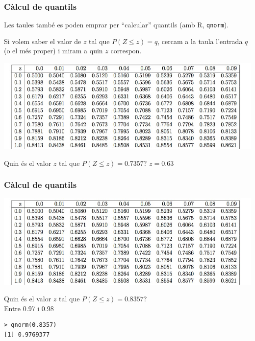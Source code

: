 \documentclass[12pt,t]{beamer}\usepackage[]{graphicx}\usepackage[]{color}
\renewcommand{\leq}{\leqslant}
\theoremstyle{plain}
\theoremstyle{definition}
\begin{document}
\begin{frame}
\frametitle{Càlcul de quantils}

Les taules també es poden emprar per ``calcular'' quantils (amb R, \texttt{qnorm}).
\medskip

Si volem saber el valor de $z$ tal que $P(Z\leq z)=q$, cercam a la taula l'entrada $q$ (o el més proper) i miram a quin $z$ correspon.
\vspace*{-3ex}

\begin{center}
\hspace*{-0.4cm}\includegraphics[width=1.1\linewidth]{tabla.jpg}
\end{center}
\vspace*{-2ex}

Quin és el valor $z$ tal que $P(Z\leq z)=0.7357$? $z=0.63$


\end{frame}

\begin{frame}[fragile]
\frametitle{Càlcul de quantils}
\vspace*{-1cm}


\begin{center}
\hspace*{-0.4cm}\includegraphics[width=1.1\linewidth]{tabla.jpg}
\end{center}
\vspace*{-2ex}

Quin és el valor $z$ tal que $P(Z\leq z)=0.8357$?\\ \pause Entre 0.97 i 0.98
\begin{verbatim}
> qnorm(0.8357)
[1] 0.9769377
\end{verbatim}

\end{frame}
\end{document}
